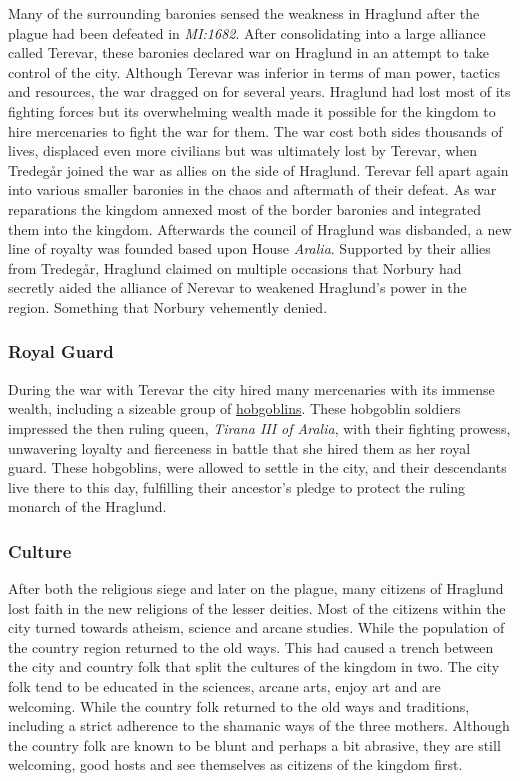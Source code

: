 Many of the surrounding baronies sensed the weakness in Hraglund after the
plague had been defeated in \emph{MI:1682}. After consolidating into a large
alliance called Terevar, these baronies declared war on Hraglund in an attempt
to take control of the city. Although Terevar was inferior in terms of man
power, tactics and resources, the war dragged on for several years. Hraglund
had lost most of its fighting forces but its overwhelming wealth made it
possible for the kingdom to hire mercenaries to fight the war for them. The
war cost both sides thousands of lives, displaced even more civilians but was
ultimately lost by Terevar, when Tredegår joined the war as allies on the side
of Hraglund. Terevar fell apart again into various smaller baronies in the
chaos and aftermath of their defeat. As war reparations the kingdom annexed
most of the border baronies and integrated them into the kingdom. Afterwards
the council of Hraglund was disbanded, a new line of royalty was founded based
upon House \emph{Aralia}. Supported by their allies from Tredegår, Hraglund
claimed on multiple occasions that Norbury had secretly aided the alliance of
Nerevar to weakened Hraglund's power in the region. Something that Norbury
vehemently denied.

\subsubsection{Royal Guard}
\label{sec:Royal Guard of Hraglund}

During the war with Terevar the city hired many mercenaries with its immense
wealth, including a sizeable group of \hyperref[sec:Hobgoblins]{hobgoblins}.
These hobgoblin soldiers impressed the then ruling queen, \emph{Tirana III of
  Aralia}, with their fighting prowess, unwavering loyalty and fierceness in
battle that she hired them as her royal guard. These hobgoblins, were allowed
to settle in the city, and their descendants live there to this day,
fulfilling their ancestor's pledge to protect the ruling monarch of the
Hraglund.

\subsubsection{Culture}

After both the religious siege and later on the plague, many citizens of
Hraglund lost faith in the new religions of the lesser deities. Most of
the citizens within the city turned towards atheism, science and arcane
studies. While the population of the country region returned to the old
ways. This had caused a trench between the city and country folk that split
the cultures of the kingdom in two. The city folk tend to be educated in
the sciences, arcane arts, enjoy art and are welcoming. While the country folk
returned to the old ways and traditions, including a strict adherence to the
shamanic ways of the three mothers. Although the country folk are known to be
blunt and perhaps a bit abrasive, they are still welcoming, good hosts and see
themselves as citizens of the kingdom first.

